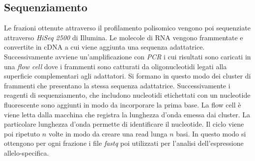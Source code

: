 \subsection{Sequenziamento}
Le frazioni ottenute attraverso il profilamento polisomico vengono poi sequenziate attraverso \emph{HiSeq 2500} di Illumina.
Le molecole di RNA vengono frammentate e convertite in cDNA a cui viene aggiunta una sequenza adattatrice.
Successivamente avviene un'amplificazione con \emph{PCR} i cui risultati sono caricati in una \emph{flow cell} dove i frammenti sono catturati da oligonucleotidi legati alla superficie complementari agli adattatori.
Si formano in questo modo dei cluster di frammenti che presentano la stessa sequenza adattatrice.
Successivamente i reagenti di sequenziamento, che includono nucleotidi etichettati con un nucleotide fluorescente sono aggiunti in modo da incorporare la prima base.
La flow cell \`e viene letta dalla macchina che registra la lunghezza d'onda emessa dai cluster.
La particolare lunghezza d'onda permette di identificare il nucleotide.
Il ciclo viene poi ripetuto $n$ volte in modo da creare una read lunga $n$ basi.
In questo modo si ottengono per ogni frazione i file \emph{fastq} poi utilizzati per l'analisi dell'espressione allelo-specifica.

